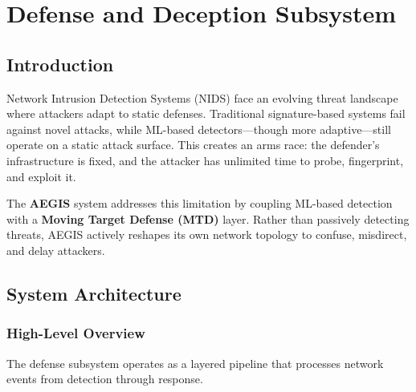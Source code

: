 
\chapter{Defense and Deception Subsystem}

\section{Introduction}

Network Intrusion Detection Systems (NIDS) face an evolving threat landscape where attackers adapt to static defenses. Traditional signature-based systems fail against novel attacks, while ML-based detectors---though more adaptive---still operate on a static attack surface. This creates an arms race: the defender's infrastructure is fixed, and the attacker has unlimited time to probe, fingerprint, and exploit it.

The \textbf{AEGIS} system addresses this limitation by coupling ML-based detection with a \textbf{Moving Target Defense (MTD)} layer. Rather than passively detecting threats, AEGIS actively reshapes its own network topology to confuse, misdirect, and delay attackers.

\section{System Architecture}

\subsection{High-Level Overview}

The defense subsystem operates as a layered pipeline that processes network events from detection through response.

